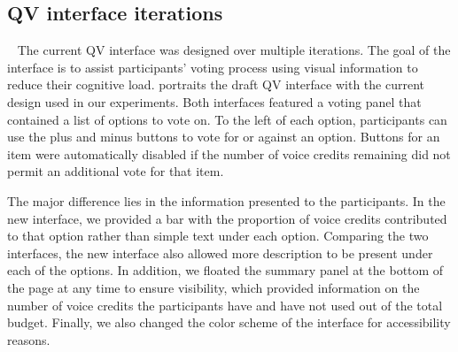 \subsection{QV interface iterations}~\label{appx_qv_interface}
The current QV interface was designed over multiple iterations. The goal of the interface is to assist participants' voting process using visual information to reduce their cognitive load.  portraits the draft QV interface with the current design used in our experiments. Both interfaces featured a voting panel that contained a list of options to vote on. To the left of each option, participants can use the plus and minus buttons to vote for or against an option. Buttons for an item were automatically disabled if the number of voice credits remaining did not permit an additional vote for that item. 

The major difference lies in the information presented to the participants. In the new interface, we provided a bar with the proportion of voice credits contributed to that option rather than simple text under each option. Comparing the two interfaces, the new interface also allowed more description to be present under each of the options. In addition, we floated the summary panel at the bottom of the page at any time to ensure visibility, which provided information on the number of voice credits the participants have and have not used out of the total budget. Finally, we also changed the color scheme of the interface for accessibility reasons.

